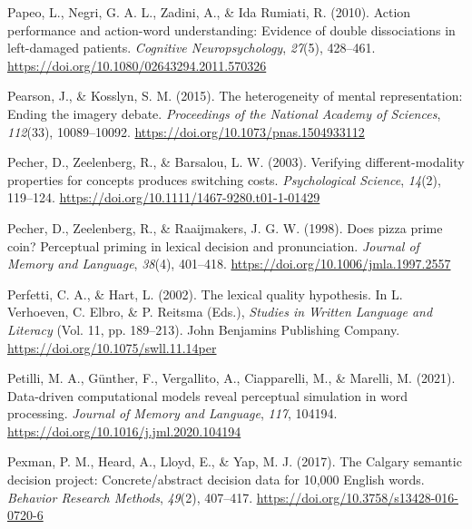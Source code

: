 \documentclass[
  12pt,
  man,floatsintext]{apa7}
\newlength{\cslhangindent}
\newlength{\cslentryspacingunit} %
\newenvironment{CSLReferences}[2] %
 {%
  \setlength{\parindent}{0pt}
  \ifodd #1
  \let\oldpar\par
  \def\par{\hangindent=\cslhangindent\oldpar}
  \fi
  \setlength{\parskip}{#2\cslentryspacingunit}
 }%
 {}
\begin{document}
\begin{CSLReferences}{1}{0}
\leavevmode{}%
Papeo, L., Negri, G. A. L., Zadini, A., \& Ida Rumiati, R. (2010). Action performance and action-word understanding: {Evidence} of double dissociations in left-damaged patients. \emph{Cognitive Neuropsychology}, \emph{27}(5), 428--461. \url{https://doi.org/10.1080/02643294.2011.570326}

\leavevmode{}%
Pearson, J., \& Kosslyn, S. M. (2015). The heterogeneity of mental representation: {Ending} the imagery debate. \emph{Proceedings of the National Academy of Sciences}, \emph{112}(33), 10089--10092. \url{https://doi.org/10.1073/pnas.1504933112}

\leavevmode{}%
Pecher, D., Zeelenberg, R., \& Barsalou, L. W. (2003). Verifying different-modality properties for concepts produces switching costs. \emph{Psychological Science}, \emph{14}(2), 119--124. \url{https://doi.org/10.1111/1467-9280.t01-1-01429}

\leavevmode{}%
Pecher, D., Zeelenberg, R., \& Raaijmakers, J. G. W. (1998). Does pizza prime coin? {Perceptual} priming in lexical decision and pronunciation. \emph{Journal of Memory and Language}, \emph{38}(4), 401--418. \url{https://doi.org/10.1006/jmla.1997.2557}

\leavevmode{}%
Perfetti, C. A., \& Hart, L. (2002). The lexical quality hypothesis. In L. Verhoeven, C. Elbro, \& P. Reitsma (Eds.), \emph{Studies in {Written Language} and {Literacy}} (Vol. 11, pp. 189--213). {John Benjamins Publishing Company}. \url{https://doi.org/10.1075/swll.11.14per}

\leavevmode{}%
Petilli, M. A., Günther, F., Vergallito, A., Ciapparelli, M., \& Marelli, M. (2021). Data-driven computational models reveal perceptual simulation in word processing. \emph{Journal of Memory and Language}, \emph{117}, 104194. \url{https://doi.org/10.1016/j.jml.2020.104194}

\leavevmode{}%
Pexman, P. M., Heard, A., Lloyd, E., \& Yap, M. J. (2017). The {Calgary} semantic decision project: {Concrete}/abstract decision data for 10,000 {English} words. \emph{Behavior Research Methods}, \emph{49}(2), 407--417. \url{https://doi.org/10.3758/s13428-016-0720-6}


\end{CSLReferences}
\end{document}
